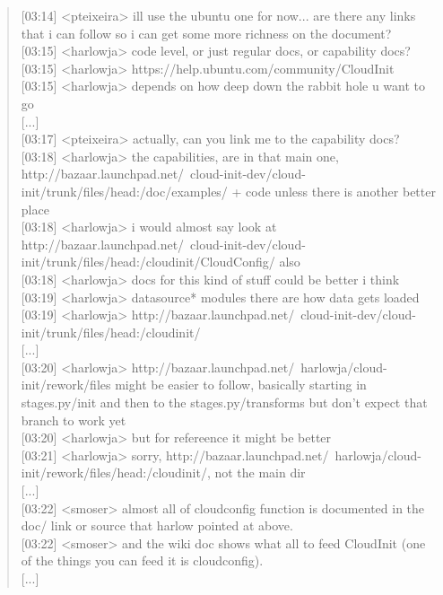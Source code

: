 \begin{verse}
{[}03:14{]} {<}pteixeira{>} ill use the ubuntu one for now... are there any links that i can follow so i can get some more richness on the document?\\
{[}03:15{]} {<}harlowja{>} code level, or just regular docs, or capability docs?\\
{[}03:15{]} {<}harlowja{>} https://help.ubuntu.com/community/CloudInit\\
{[}03:15{]} {<}harlowja{>} depends on how deep down the rabbit hole u want to go\\
{[}...{]}\\
{[}03:17{]} {<}pteixeira{>} actually, can you link me to the capability docs?\\
{[}03:18{]} {<}harlowja{>} the capabilities, are in that main one, http://bazaar.launchpad.net/~cloud-init-dev/cloud-init/trunk/files/head:/doc/examples/ + code unless there is another better place\\
{[}03:18{]} {<}harlowja{>} i would almost say look at http://bazaar.launchpad.net/~cloud-init-dev/cloud-init/trunk/files/head:/cloudinit/CloudConfig/ also\\
{[}03:18{]} {<}harlowja{>} docs for this kind of stuff could be better i think\\
{[}03:19{]} {<}harlowja{>} datasource* modules there are how data gets loaded\\
{[}03:19{]} {<}harlowja{>} http://bazaar.launchpad.net/~cloud-init-dev/cloud-init/trunk/files/head:/cloudinit/\\
{[}...{]}\\
{[}03:20{]} {<}harlowja{>} http://bazaar.launchpad.net/~harlowja/cloud-init/rework/files might be easier to follow, basically starting in stages.py/init and then to the stages.py/transforms but don't expect that branch to work yet\\
{[}03:20{]} {<}harlowja{>} but for refereence it might be better\\
{[}03:21{]} {<}harlowja{>} sorry, http://bazaar.launchpad.net/~harlowja/cloud-init/rework/files/head:/cloudinit/, not the main dir\\
{[}...{]}\\
{[}03:22{]} {<}smoser{>} almost all of cloudconfig function is documented in the doc/ link or source that harlow pointed at above.\\
{[}03:22{]} {<}smoser{>} and the wiki doc shows what all to feed CloudInit (one of the things you can feed it is cloudconfig).\\
{[}...{]}\\
\end{verse}
